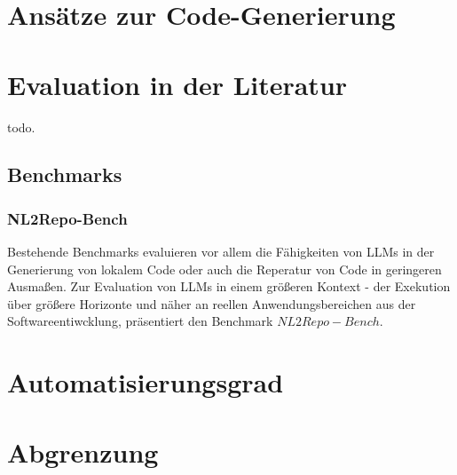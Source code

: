 

\section{Ansätze zur Code-Generierung}\label{ch:Ansätze zur Code-Generierung}



\section{Evaluation in der Literatur}\label{ch:Benchmarks und Datensätze}

todo.

\subsection{Benchmarks}

\subsubsection{NL2Repo-Bench}

Bestehende Benchmarks evaluieren vor allem die Fähigkeiten von LLMs in der Generierung von lokalem Code oder auch die Reperatur von Code in geringeren Ausmaßen. Zur Evaluation von LLMs in einem größeren Kontext - der Exekution über größere Horizonte und näher an reellen Anwendungsbereichen aus der Softwareentiwcklung, präsentiert \cite{dingNL2RepoBenchLongHorizonRepository2026} den Benchmark $NL2Repo-Bench$. 



\section{Automatisierungsgrad}\label{ch:Automatisierungsgrad}



\section{Abgrenzung}\label{ch:Abgrenzung}



